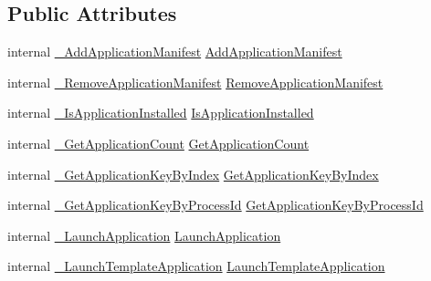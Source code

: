 \subsection*{Public Attributes}
\begin{DoxyCompactItemize}
\item 
internal \mbox{\hyperlink{struct_valve_1_1_v_r_1_1_i_v_r_applications_a76f61ada24748861c48a7a358a129f02}{\+\_\+\+Add\+Application\+Manifest}} \mbox{\hyperlink{struct_valve_1_1_v_r_1_1_i_v_r_applications_a396c7e14f70a0d03464fcb8f1cacde02}{Add\+Application\+Manifest}}
\item 
internal \mbox{\hyperlink{struct_valve_1_1_v_r_1_1_i_v_r_applications_af57c8e14b228aa90c1de06e488d188e1}{\+\_\+\+Remove\+Application\+Manifest}} \mbox{\hyperlink{struct_valve_1_1_v_r_1_1_i_v_r_applications_ac7b0c435cc775f1b86a4d007acf650a5}{Remove\+Application\+Manifest}}
\item 
internal \mbox{\hyperlink{struct_valve_1_1_v_r_1_1_i_v_r_applications_a55c08f26570b4ebbcc12d975a0580058}{\+\_\+\+Is\+Application\+Installed}} \mbox{\hyperlink{struct_valve_1_1_v_r_1_1_i_v_r_applications_a41b0bcd67ef15c7da42974931df2f6ad}{Is\+Application\+Installed}}
\item 
internal \mbox{\hyperlink{struct_valve_1_1_v_r_1_1_i_v_r_applications_ad5a465e75026a5c1bf8e787a8613132b}{\+\_\+\+Get\+Application\+Count}} \mbox{\hyperlink{struct_valve_1_1_v_r_1_1_i_v_r_applications_a22aee0bcc514fa894b599b58ee72e4da}{Get\+Application\+Count}}
\item 
internal \mbox{\hyperlink{struct_valve_1_1_v_r_1_1_i_v_r_applications_a63e1092a4592ad95064f4948b5bc743f}{\+\_\+\+Get\+Application\+Key\+By\+Index}} \mbox{\hyperlink{struct_valve_1_1_v_r_1_1_i_v_r_applications_ae3a1cf0df983ee26ce4300144aff769d}{Get\+Application\+Key\+By\+Index}}
\item 
internal \mbox{\hyperlink{struct_valve_1_1_v_r_1_1_i_v_r_applications_aeadcd6cb5dd134f4d83e9d34d05a6318}{\+\_\+\+Get\+Application\+Key\+By\+Process\+Id}} \mbox{\hyperlink{struct_valve_1_1_v_r_1_1_i_v_r_applications_a3f25f2146ae2e2a30555ea5d2c54885d}{Get\+Application\+Key\+By\+Process\+Id}}
\item 
internal \mbox{\hyperlink{struct_valve_1_1_v_r_1_1_i_v_r_applications_acc906c27dba9c0fbc2398ae17e058352}{\+\_\+\+Launch\+Application}} \mbox{\hyperlink{struct_valve_1_1_v_r_1_1_i_v_r_applications_a122f2eda209a9f552f234cd62cf583e0}{Launch\+Application}}
\item 
internal \mbox{\hyperlink{struct_valve_1_1_v_r_1_1_i_v_r_applications_aeefde1c2d898ac0a0c855e15945f2bf3}{\+\_\+\+Launch\+Template\+Application}} \mbox{\hyperlink{struct_valve_1_1_v_r_1_1_i_v_r_applications_add86c723c6748931bb8e74f6ee158a24}{Launch\+Template\+Application}}

\end{DoxyCompactItemize}
